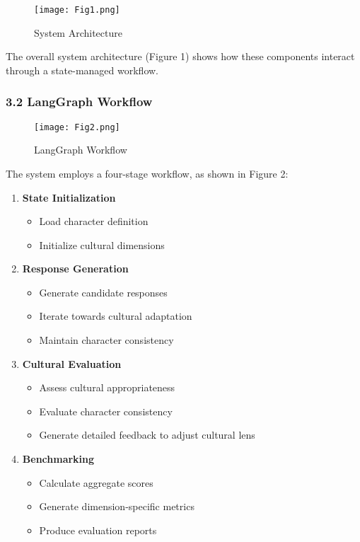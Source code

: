 \documentclass[
]{article}
\providecommand{\tightlist}{%
  \setlength{\itemsep}{0pt}\setlength{\parskip}{0pt}}
\begin{document}
\begin{figure}
    \centering
    \texttt{[image: Fig1.png]}
    \caption{System Architecture}
    \label{fig:enter-label}
\end{figure}

The overall system architecture (Figure 1) shows how these components
interact through a state-managed workflow.

\subsubsection{3.2 LangGraph Workflow}\label{langgraph-workflow}

\begin{figure}
    \centering
    \texttt{[image: Fig2.png]}
    \caption{LangGraph Workflow}
    \label{fig:enter-label}
\end{figure}

The system employs a four-stage workflow, as shown in Figure 2:

\begin{enumerate}
\def\labelenumi{\arabic{enumi}.}
\tightlist
\item
  \textbf{State Initialization}

  \begin{itemize}
  \tightlist
  \item
    Load character definition
  \item
    Initialize cultural dimensions
  \end{itemize}
\item
  \textbf{Response Generation}

  \begin{itemize}
  \tightlist
  \item
    Generate candidate responses
  \item
    Iterate towards cultural adaptation
  \item
    Maintain character consistency
  \end{itemize}
\item
  \textbf{Cultural Evaluation}

  \begin{itemize}
  \tightlist
  \item
    Assess cultural appropriateness
  \item
    Evaluate character consistency
  \item
    Generate detailed feedback to adjust cultural lens
  \end{itemize}
\item
  \textbf{Benchmarking}

  \begin{itemize}
  \tightlist
  \item
    Calculate aggregate scores
  \item
    Generate dimension-specific metrics
  \item
    Produce evaluation reports
  \end{itemize}
\end{enumerate}
\end{document}
